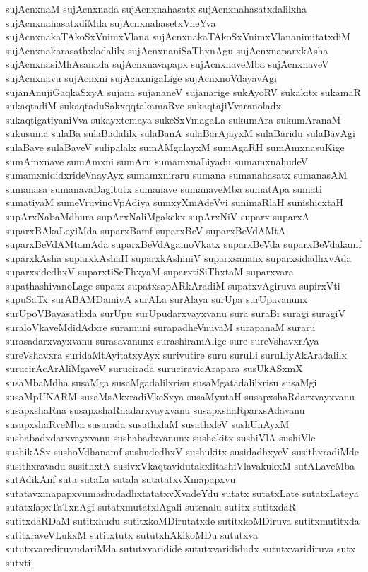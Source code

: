 {sujAcnxnaM
sujAcnxnada
sujAcnxnahasatx
sujAcnxnahasatxdalilxha
sujAcnxnahasatxdiMda
sujAcnxnahasetxVneYva
sujAcnxnakaTAkoSxVnimxVlana
sujAcnxnakaTAkoSxVnimxVlananimitatxdiM
sujAcnxnakarasathxladalilx
sujAcnxnaniSaThxnAgu
sujAcnxnaparxkAsha
sujAcnxnasiMhAsanada
sujAcnxnavapapx
sujAcnxnaveMba
sujAcnxnaveV
sujAcnxnavu
sujAcnxni
sujAcnxnigaLige
sujAcnxnoVdayavAgi
sujanAnujiGaqkaSxyA
sujana
sujananeV
sujanarige
sukAyoRV
sukakitx
sukamaR
sukaqtadiM
sukaqtaduSakxqqtakamaRve
sukaqtajiVvaranoladx
sukaqtigatiyaniVva
sukayxtemaya
sukeSxVmagaLa
sukumAra
sukumAranaM
sukusuma
sulaBa
sulaBadalilx
sulaBanA
sulaBarAjayxM
sulaBaridu
sulaBavAgi
sulaBave
sulaBaveV
sulipalalx
sumAMgalayxM
sumAgaRH
sumAmxnasuKige
sumAmxnave
sumAmxni
sumAru
sumamxnaLiyadu
sumamxnahudeV
sumamxnididxrideVnayAyx
sumamxniraru
sumana
sumanahasatx
sumanasAM
sumanasa
sumanavaDagitutx
sumanave
sumanaveMba
sumatApa
sumati
sumatiyaM
sumeVruvinoVpAdiya
sumxyXmAdeVvi
sunimaRlaH
sunishicxtaH
supArxNabaMdhura
supArxNaliMgakekx
supArxNiV
suparx
suparxA
suparxBAkaLeyiMda
suparxBamf
suparxBeV
suparxBeVdAMtA
suparxBeVdAMtamAda
suparxBeVdAgamoVkatx
suparxBeVda
suparxBeVdakamf
suparxkAsha
suparxkAshaH
suparxkAshiniV
suparxsananx
suparxsidadhxvAda
suparxsidedhxV
suparxtiSeThxyaM
suparxtiSiThxtaM
suparxvara
supathashivanoLage
supatx
supatxsapARkAradiM
supatxvAgiruva
supirxVti
supuSaTx
surABAMDamivA
surALa
surAlaya
surUpa
surUpavanunx
surUpoVBayasathxla
surUpu
surUpudarxvayxvanu
sura
suraBi
suragi
suragiV
suraloVkaveMdidAdxre
suramuni
surapadheVnuvaM
surapanaM
suraru
surasadarxvayxvanu
surasavanunx
surashiramAlige
sure
sureVshavxrAya
sureVshavxra
suridaMtAyitatxyAyx
surivutire
suru
suruLi
suruLiyAkAradalilx
surucirAcArAliMgaveV
surucirada
suruciravicArapara
susUkASxmX
susaMbaMdha
susaMga
susaMgadalilxrisu
susaMgatadalilxrisu
susaMgi
susaMpUNARM
susaMsAkxradiVkeSxya
susaMyutaH
susapxshaRdarxvayxvanu
susapxshaRna
susapxshaRnadarxvayxvanu
susapxshaRparxsAdavanu
susapxshaRveMba
susarada
susathxlaM
susathxleV
sushUnAyxM
sushabadxdarxvayxvanu
sushabadxvanunx
sushakitx
sushiVlA
sushiVle
sushikASx
sushoVdhanamf
sushudedhxV
sushukitx
susidadhxyeV
susithxradiMde
susithxravadu
susithxtA
susivxVkaqtavidutakxlitashiVlavakukxM
sutALaveMba
sutAdikAnf
suta
sutaLa
sutala
sutatatxvXmapapxvu
sutatavxmapapxvumashudadhxtatatxvXvadeYdu
sutatx
sutatxLate
sutatxLateya
sutatxlapxTaTxnAgi
sutatxmutatxlAgali
sutenalu
sutitx
sutitxdaR
sutitxdaRDaM
sutitxhudu
sutitxkoMDirutatxde
sutitxkoMDiruva
sutitxmutitxda
sutitxraveVLukxM
sutitxtutx
sututxhAkikoMDu
sututxva
sututxvarediruvudariMda
sututxvaridide
sututxvarididudx
sututxvaridiruva
sutx
sutxti
}
